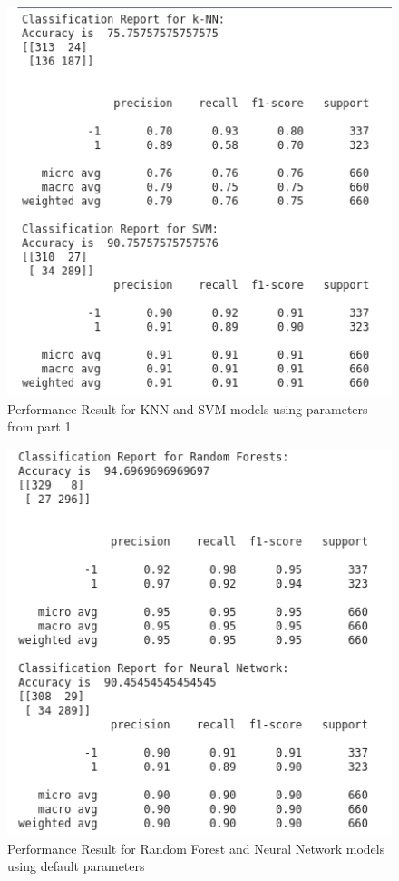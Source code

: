 \begin{figure}[!ht]
 \centering
\includegraphics[width=6.1in]{assignment2/2-3-a1.png}
\caption{\label{fig:resultsknnsvm} Performance Result for KNN and SVM models using parameters from part 1}
\end{figure}
\begin{figure}[!ht]
 \centering
\includegraphics[width=6.1in]{assignment2/2-3-a2.png}
\caption{\label{fig:resulstsrfnn} Performance Result for Random Forest and Neural Network models using default parameters}
\end{figure}


